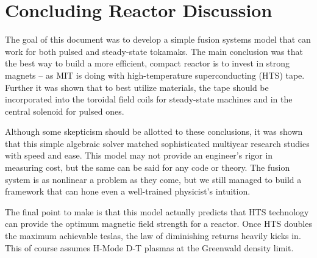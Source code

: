 \chapter{Concluding Reactor Discussion}

The goal of this document was to develop a simple fusion systems model that can work for both pulsed and steady-state tokamaks. The main conclusion was that the best way to build a more efficient, compact reactor is to invest in strong magnets -- as MIT is doing with high-temperature superconducting (HTS) tape. Further it was shown that to best utilize materials, the tape should be incorporated into the toroidal field coils for steady-state machines and in the central solenoid for pulsed ones.

Although some skepticism should be allotted to these conclusions, it was shown that this simple algebraic solver matched sophisticated multiyear research studies with speed and ease. This model may not provide an engineer's rigor in measuring cost, but the same can be said for any code or theory. The fusion system is as nonlinear a problem as they come, but we still managed to build a framework that can hone even a well-trained physicist's intuition.

The final point to make is that this model actually predicts that HTS technology can provide the optimum magnetic field strength for a reactor. Once HTS doubles the maximum achievable teslas, the law of diminishing returns heavily kicks in. This of course assumes H-Mode D-T plasmas at the Greenwald density limit.
